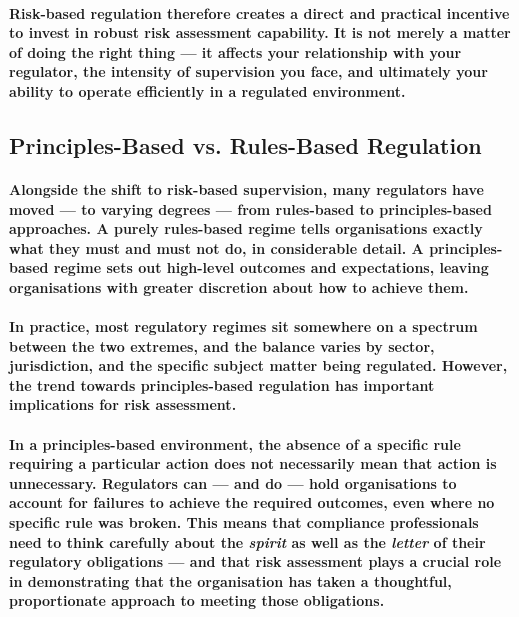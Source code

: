 \paragraph{Risk-based regulation therefore creates a direct and practical incentive to invest in robust risk assessment capability. It is not merely a matter of doing the right thing — it affects your relationship with your regulator, the intensity of supervision you face, and ultimately your ability to operate efficiently in a regulated environment.}

\subsection{Principles-Based vs. Rules-Based Regulation}
\paragraph{Alongside the shift to risk-based supervision, many regulators have moved — to varying degrees — from \textbf{rules-based} to \textbf{principles-based} approaches. A purely rules-based regime tells organisations exactly what they must and must not do, in considerable detail. A principles-based regime sets out high-level outcomes and expectations, leaving organisations with greater discretion about how to achieve them.}
\paragraph{In practice, most regulatory regimes sit somewhere on a spectrum between the two extremes, and the balance varies by sector, jurisdiction, and the specific subject matter being regulated. However, the trend towards principles-based regulation has important implications for risk assessment.}
\paragraph{In a principles-based environment, the absence of a specific rule requiring a particular action does not necessarily mean that action is unnecessary. Regulators can — and do — hold organisations to account for failures to achieve the required outcomes, even where no specific rule was broken. This means that compliance professionals need to think carefully about the \textit{spirit} as well as the \textit{letter} of their regulatory obligations — and that risk assessment plays a crucial role in demonstrating that the organisation has taken a thoughtful, proportionate approach to meeting those obligations.}

